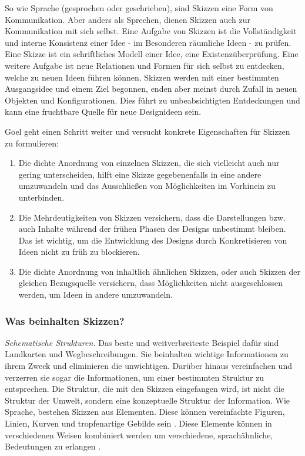 \medskip So wie Sprache (gesprochen oder geschrieben), sind Skizzen eine Form von Kommunikation. Aber anders als Sprechen, dienen Skizzen auch zur Kommunikation mit sich selbst. Eine Aufgabe von Skizzen ist die Vollständigkeit und interne Konsistenz einer Idee - im Besonderen räumliche Ideen - zu prüfen. Eine Skizze ist ein schriftliches Modell einer Idee, eine Existenzüberprüfung. Eine weitere Aufgabe ist neue Relationen und Formen für sich selbst zu entdecken, welche zu neuen Ideen führen können. Skizzen werden mit einer bestimmten Ausgangsidee und einem Ziel begonnen, enden aber meinst durch Zufall in neuen Objekten und Konfigurationen. Dies führt zu unbeabsichtigten Entdeckungen und kann eine fruchtbare Quelle für neue Designideen sein. \citep{Tversky:2002}

\medskip Goel geht einen Schritt weiter und versucht konkrete Eigenschaften für Skizzen zu formulieren: 
\begin{enumerate}
	\item Die dichte Anordnung von einzelnen Skizzen, die sich vielleicht auch nur gering unterscheiden, hilft eine Skizze gegebenenfalls in eine andere umzuwandeln und das Ausschließen von Möglichkeiten im Vorhinein zu unterbinden.
	\item Die Mehrdeutigkeiten von Skizzen versichern, dass die Darstellungen bzw. auch Inhalte während der frühen Phasen des Designs unbestimmt bleiben. Das ist wichtig, um die Entwicklung des Designs durch Konkretisieren von Ideen nicht zu früh zu blockieren.
	\item Die dichte Anordnung von inhaltlich ähnlichen Skizzen, oder auch Skizzen der gleichen Bezugsquelle versichern, dass Möglichkeiten nicht ausgeschlossen werden, um Ideen in andere umzuwandeln.
\end{enumerate}
\begin{flushright}\citep{Goel:1995}\end{flushright}

\subsubsection{Was beinhalten Skizzen?} 
\emph{Schematische Strukturen.} Das beste und weitverbreiteste Beispiel dafür sind Landkarten und Wegbeschreibungen. Sie beinhalten wichtige Informationen zu ihrem Zweck und eliminieren die unwichtigen. Darüber hinaus vereinfachen und verzerren sie sogar die Informationen, um einer bestimmten Struktur zu entsprechen. Die Struktur, die mit den Skizzen eingefangen wird, ist nicht die Struktur der Umwelt, sondern eine konzeptuelle Struktur der Information. Wie Sprache, bestehen Skizzen aus Elementen. Diese können vereinfachte Figuren, Linien, Kurven und tropfenartige Gebilde sein \citep{Tversky:2000}. Diese Elemente können in verschiedenen Weisen kombiniert werden um verschiedene, sprachähnliche, Bedeutungen zu erlangen \citep{Goodman:1968}.


